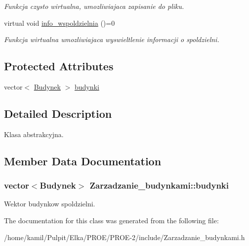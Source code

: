 \begin{DoxyCompactItemize}
\begin{DoxyCompactList}\small\item\em Funkcja czysto wirtualna, umozliwiajaca zapisanie do pliku. \end{DoxyCompactList}\item 
\hypertarget{class_zarzadzanie__budynkami_a323d1ac227348130b3f74ec3faa96cc3}{}virtual void \hyperlink{class_zarzadzanie__budynkami_a323d1ac227348130b3f74ec3faa96cc3}{info\+\_\+wspoldzielnia} ()=0\label{class_zarzadzanie__budynkami_a323d1ac227348130b3f74ec3faa96cc3}

\begin{DoxyCompactList}\small\item\em Funkcja wirtualna umozliwiajaca wyswieltlenie informacji o spoldzielni. \end{DoxyCompactList}\end{DoxyCompactItemize}
\subsection*{Protected Attributes}
\begin{DoxyCompactItemize}
\item 
vector$<$ \hyperlink{class_budynek}{Budynek} $>$ \hyperlink{class_zarzadzanie__budynkami_ae401202072085302f3d452a3279a2015}{budynki}
\end{DoxyCompactItemize}


\subsection{Detailed Description}
Klasa abstrakcyjna. 

\subsection{Member Data Documentation}
\hypertarget{class_zarzadzanie__budynkami_ae401202072085302f3d452a3279a2015}{}
\subsubsection[{budynki}]{\setlength{\rightskip}{0pt plus 5cm}vector$<${\bf Budynek}$>$ Zarzadzanie\+\_\+budynkami\+::budynki\hspace{0.3cm}{\ttfamily [protected]}}\label{class_zarzadzanie__budynkami_ae401202072085302f3d452a3279a2015}

\begin{DoxyItemize}
\item Wektor budynkow spoldzielni. 
\end{DoxyItemize}

The documentation for this class was generated from the following file\+:\begin{DoxyCompactItemize}
\item 
/home/kamil/\+Pulpit/\+Elka/\+P\+R\+O\+E/\+P\+R\+O\+E-\/2/include/Zarzadzanie\+\_\+budynkami.\+h\end{DoxyCompactItemize}
